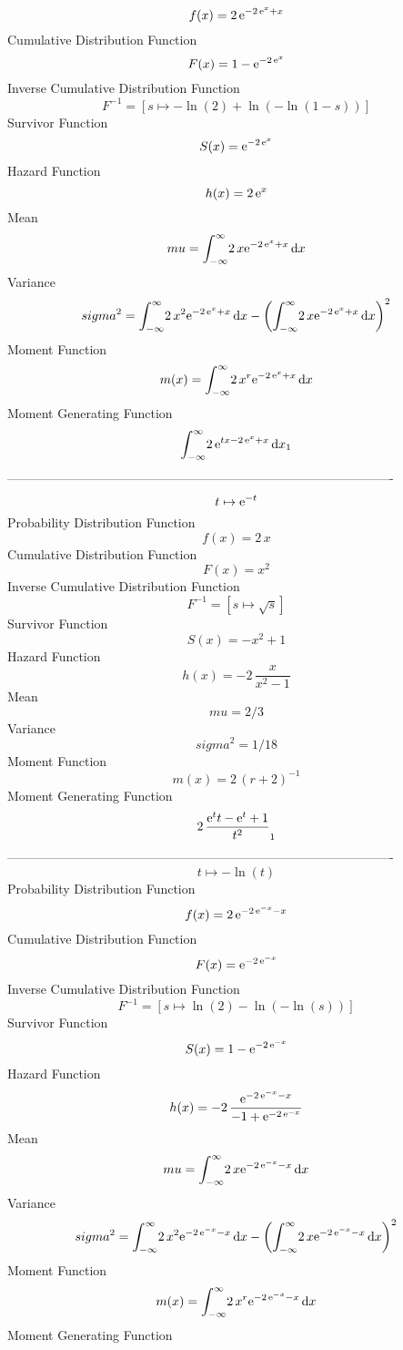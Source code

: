 \documentclass[12pt]{article}
\begin{document}
$$  f(x)=2\,{{\rm e}^{-2\,{{\rm e}^{x}}+x}}
$$Cumulative Distribution Function  
 $$F(x)=1-{{\rm e}^{-2\,{{\rm e}^{x}}}}
$$ Inverse Cumulative Distribution Function 
  $$F^{-1} = [s\mapsto -\ln  \left( 2 \right) +\ln  \left( -\ln  \left( 1-s
 \right)  \right) ]
$$Survivor Function 
 $$ S(x)={{\rm e}^{-2\,{{\rm e}^{x}}}}
$$ Hazard Function 
 $$ h(x)=2\,{{\rm e}^{x}}
$$Mean 
 $$ mu=\int_{-\infty }^{\infty }\!2\,x{{\rm e}^{-2\,{{\rm e}^{x}}+x}}
\,{\rm d}x
$$ Variance 
 $$ sigma^2 = \int_{-\infty }^{\infty }\!2\,{x}^{2}{{\rm e}^{-2\,{{\rm e}^{x}}+x}}
\,{\rm d}x- \left( \int_{-\infty }^{\infty }\!2\,x{{\rm e}^{-2\,{
{\rm e}^{x}}+x}}\,{\rm d}x \right) ^{2}
$$Moment Function 
 $$ m(x) = \int_{-\infty }^{\infty }\!2\,{x}^{r}{{\rm e}^{-2\,{{\rm e}^{x}}+x}}
\,{\rm d}x
$$ Moment Generating Function 
 $$\int_{-\infty }^{\infty }\!2\,{{\rm e}^{tx-2\,{{\rm e}^{x}}+x}}
\,{\rm d}x_{{1}}
$$-------------------------------------------------------------------------------------------  \\$$t\mapsto {{\rm e}^{-t}}
$$Probability Distribution Function 
$$  f(x)=2\,x
$$Cumulative Distribution Function  
 $$F(x)={x}^{2}
$$ Inverse Cumulative Distribution Function 
  $$F^{-1} = [s\mapsto \sqrt {s}]
$$Survivor Function 
 $$ S(x)=-{x}^{2}+1
$$ Hazard Function 
 $$ h(x)=-2\,{\frac {x}{{x}^{2}-1}}
$$Mean 
 $$ mu=2/3
$$ Variance 
 $$ sigma^2 = 1/18
$$Moment Function 
 $$ m(x) = 2\, \left( r+2 \right) ^{-1}
$$ Moment Generating Function 
 $$2\,{\frac {{{\rm e}^{t}}t-{{\rm e}^{t}}+1}{{t}^{2}}}_{{1}}
$$-------------------------------------------------------------------------------------------  \\$$t\mapsto -\ln  \left( t \right) 
$$Probability Distribution Function 
$$  f(x)=2\,{{\rm e}^{-2\,{{\rm e}^{-x}}-x}}
$$Cumulative Distribution Function  
 $$F(x)={{\rm e}^{-2\,{{\rm e}^{-x}}}}
$$ Inverse Cumulative Distribution Function 
  $$F^{-1} = [s\mapsto \ln  \left( 2 \right) -\ln  \left( -\ln  \left( s \right) 
 \right) ]
$$Survivor Function 
 $$ S(x)=1-{{\rm e}^{-2\,{{\rm e}^{-x}}}}
$$ Hazard Function 
 $$ h(x)=-2\,{\frac {{{\rm e}^{-2\,{{\rm e}^{-x}}-x}}}{-1+{{\rm e}^{-2\,{
{\rm e}^{-x}}}}}}
$$Mean 
 $$ mu=\int_{-\infty }^{\infty }\!2\,x{{\rm e}^{-2\,{{\rm e}^{-x}}-x}}
\,{\rm d}x
$$ Variance 
 $$ sigma^2 = \int_{-\infty }^{\infty }\!2\,{x}^{2}{{\rm e}^{-2\,{{\rm e}^{-x}}-x}}
\,{\rm d}x- \left( \int_{-\infty }^{\infty }\!2\,x{{\rm e}^{-2\,{
{\rm e}^{-x}}-x}}\,{\rm d}x \right) ^{2}
$$Moment Function 
 $$ m(x) = \int_{-\infty }^{\infty }\!2\,{x}^{r}{{\rm e}^{-2\,{{\rm e}^{-x}}-x}}
\,{\rm d}x
$$ Moment Generating Function 
\end{document}
